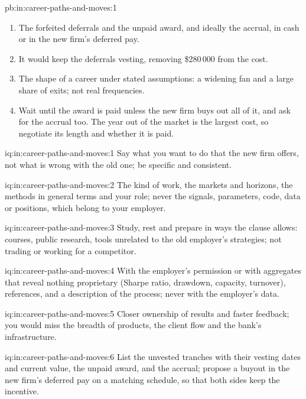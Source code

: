 \begin{solution}{pb:in:career-paths-and-moves:1}
\begin{enumerate}
a month later.
\item The forfeited deferrals and the unpaid award, and ideally the accrual, in cash or in the new firm's deferred pay.
\item It would keep the deferrals vesting, removing \$280\,000 from the cost.
\item The shape of a career under stated assumptions: a widening fan and a large share of exits; not real frequencies.
\item Wait until the award is paid unless the new firm buys out all of it, and ask for the accrual too. The year out of the
market is the largest cost, so negotiate its length and whether it is paid.
\end{enumerate}
\end{solution}

\begin{solution}{iq:in:career-paths-and-moves:1}
Say what you want to do that the new firm offers, not what is wrong with the old one; be specific and consistent.
\end{solution}

\begin{solution}{iq:in:career-paths-and-moves:2}
The kind of work, the markets and horizons, the methods in general terms and your role; never the signals, parameters,
code, data or positions, which belong to your employer.
\end{solution}

\begin{solution}{iq:in:career-paths-and-moves:3}
Study, rest and prepare in ways the clause allows: courses, public research, tools unrelated to the old employer's
strategies; not trading or working for a competitor.
\end{solution}

\begin{solution}{iq:in:career-paths-and-moves:4}
With the employer's permission or with aggregates that reveal nothing proprietary (Sharpe ratio, drawdown, capacity,
turnover), references, and a description of the process; never with the employer's data.
\end{solution}

\begin{solution}{iq:in:career-paths-and-moves:5}
Closer ownership of results and faster feedback; you would miss the breadth of products, the client flow and the bank's
infrastructure.
\end{solution}

\begin{solution}{iq:in:career-paths-and-moves:6}
List the unvested tranches with their vesting dates and current value, the unpaid award, and the accrual; propose a buyout
in the new firm's deferred pay on a matching schedule, so that both sides keep the incentive.
\end{solution}
